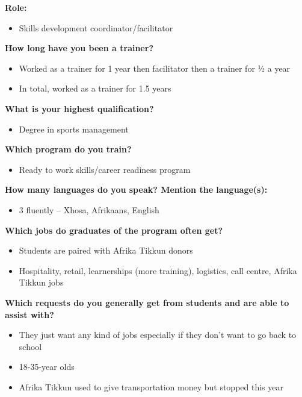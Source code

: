 \noindent\textbf{Role:}
\begin{itemize}
\item Skills development coordinator/facilitator
\end{itemize}

\noindent\textbf{How long have you been a trainer?}
\begin{itemize}
\item Worked as a trainer for 1 year then facilitator then a trainer for ½ a year
\item In total, worked as a trainer for 1.5 years
\end{itemize}

\noindent\textbf{What is your highest qualification?}
\begin{itemize}
\item Degree in sports management
\end{itemize}

\noindent\textbf{Which program do you train?}
\begin{itemize}
\item Ready to work skills/career readiness program
\end{itemize}

\noindent\textbf{How many languages do you speak? Mention the language(s):}
\begin{itemize}
\item 3 fluently – Xhosa, Afrikaans, English
\end{itemize}



\noindent\textbf{Which jobs do graduates of the program often get?}
\begin{itemize}
\item Students are paired with Afrika Tikkun donors
\item Hospitality, retail, learnerships (more training), logistics, call centre, Afrika Tikkun jobs
\end{itemize}

\noindent\textbf{Which requests do you generally get from students and are able to assist with?}
\begin{itemize}
\item They just want any kind of jobs especially if they don’t want to go back to school
\item 18-35-year olds
\item Afrika Tikkun used to give transportation money but stopped this year
\end{itemize}


